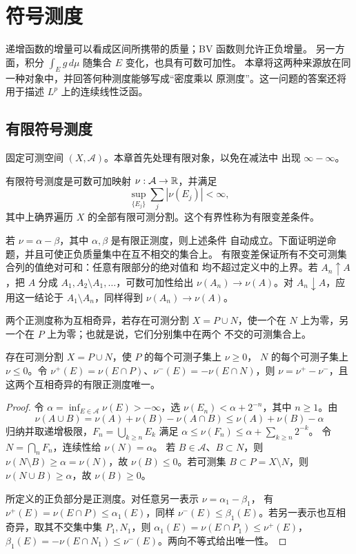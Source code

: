 \chapter{符号测度}
\label{chap:signed-measures}

递增函数的增量可以看成区间所携带的质量；BV 函数则允许正负增量。
另一方面，积分 \(\int_Eg\,d\mu\) 随集合 \(E\) 变化，也具有可数可加性。
本章将这两种来源放在同一种对象中，并回答何种测度能够写成“密度乘以
原测度”。这一问题的答案还将用于描述 \(L^p\) 上的连续线性泛函。

\section{有限符号测度}

固定可测空间 \((X,\mathcal A)\)。本章首先处理有限对象，以免在减法中
出现 \(\infty-\infty\)。

\begin{definition}
有限符号测度是可数可加映射 \(\nu:\mathcal A\to\mathbb{R}\)，并满足
\[
 \sup_{\{E_j\}}\sum_j|\nu(E_j)|<\infty,
\]
其中上确界遍历 \(X\) 的全部有限可测分割。这个有界性称为有限变差条件。
\end{definition}

若 \(\nu=\alpha-\beta\)，其中 \(\alpha,\beta\) 是有限正测度，则上述条件
自动成立。下面证明逆命题，并且可使正负质量集中在互不相交的集合上。
有限变差保证所有不交可测集合列的值绝对可和：任意有限部分的绝对值和
均不超过定义中的上界。若 \(A_n\uparrow A\)，把 \(A\) 分成
\(A_1,A_2\setminus A_1,\ldots\)，可数可加性给出
\(\nu(A_n)\to\nu(A)\)。对 \(A_n\downarrow A\)，应用这一结论于
\(A_1\setminus A_n\)，同样得到 \(\nu(A_n)\to\nu(A)\)。

两个正测度称为互相奇异，若存在可测分割 \(X=P\cup N\)，使一个在
\(N\) 上为零，另一个在 \(P\) 上为零；也就是说，它们分别集中在两个
不交的可测集合上。

\begin{theorem}\label{thm:hahn-jordan-measure}
存在可测分割 \(X=P\cup N\)，使 \(P\) 的每个可测子集上 \(\nu\ge0\)，
\(N\) 的每个可测子集上 \(\nu\le0\)。令
\(\nu^+(E)=\nu(E\cap P)\)、\(\nu^-(E)=-\nu(E\cap N)\)，则
\(\nu=\nu^+-\nu^-\)，且这两个互相奇异的有限正测度唯一。
\end{theorem}
\begin{proof}
令 \(\alpha=\inf_{E\in\mathcal A}\nu(E)>-\infty\)，选
\(\nu(E_n)<\alpha+2^{-n}\)，其中 \(n\ge1\)。由
\[
 \nu(A\cup B)=\nu(A)+\nu(B)-\nu(A\cap B)
 \le\nu(A)+\nu(B)-\alpha
\]
归纳并取递增极限，\(F_n=\bigcup_{k\ge n}E_k\) 满足
\(\alpha\le\nu(F_n)\le\alpha+\sum_{k\ge n}2^{-k}\)。
令 \(N=\bigcap_nF_n\)，连续性给 \(\nu(N)=\alpha\)。
若 \(B\in\mathcal A\)、\(B\subset N\)，则 \(\nu(N\setminus B)\ge\alpha=\nu(N)\)，故
\(\nu(B)\le0\)。若可测集 \(B\subset P=X\setminus N\)，则
\(\nu(N\cup B)\ge\alpha\)，故 \(\nu(B)\ge0\)。

所定义的正负部分是正测度。对任意另一表示 \(\nu=\alpha_1-\beta_1\)，
有 \(\nu^+(E)=\nu(E\cap P)\le\alpha_1(E)\)，同样
\(\nu^-(E)\le\beta_1(E)\)。若另一表示也互相奇异，取其不交集中集
\(P_1,N_1\)，则 \(\alpha_1(E)=\nu(E\cap P_1)\le\nu^+(E)\)，
\(\beta_1(E)=-\nu(E\cap N_1)\le\nu^-(E)\)。两向不等式给出唯一性。
\end{proof}

